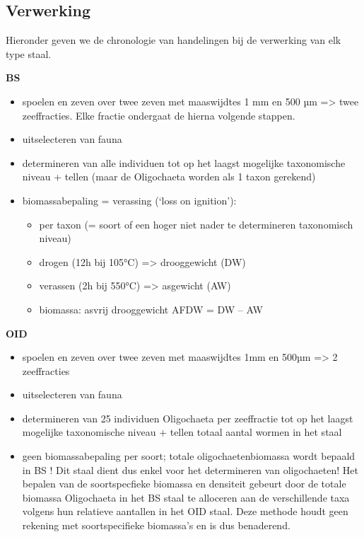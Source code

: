 \documentclass[twoside]{extreport}
\begin{document}
\hypertarget{verwerking}{%
\subsection{Verwerking}\label{verwerking}}

Hieronder geven we de chronologie van handelingen bij de verwerking van
elk type staal.

\textbf{BS}

\begin{itemize}
\tightlist
\item
  spoelen en zeven over twee zeven met maaswijdtes 1 mm en 500 µm
  =\textgreater{} twee zeeffracties. Elke fractie ondergaat de hierna
  volgende stappen.
\item
  uitselecteren van fauna
\item
  determineren van alle individuen tot op het laagst mogelijke
  taxonomische niveau + tellen (maar de Oligochaeta worden als 1 taxon
  gerekend)
\item
  biomassabepaling = verassing (`loss on ignition'):

  \begin{itemize}
  \tightlist
  \item
    per taxon (= soort of een hoger niet nader te determineren
    taxonomisch niveau)
  \item
    drogen (12h bij 105°C) =\textgreater{} drooggewicht (DW)
  \item
    verassen (2h bij 550°C) =\textgreater{} asgewicht (AW)
  \item
    biomassa: asvrij drooggewicht AFDW = DW -- AW
  \end{itemize}
\end{itemize}

\textbf{OID}

\begin{itemize}
\tightlist
\item
  spoelen en zeven over twee zeven met maaswijdtes 1mm en 500µm
  =\textgreater{} 2 zeeffracties
\item
  uitselecteren van fauna
\item
  determineren van 25 individuen Oligochaeta per zeeffractie tot op het
  laagst mogelijke taxonomische niveau + tellen totaal aantal wormen in
  het staal
\item
  geen biomassabepaling per soort; totale oligochaetenbiomassa wordt
  bepaald in BS ! Dit staal dient dus enkel voor het determineren van
  oligochaeten! Het bepalen van de soortspecfieke biomassa en densiteit
  gebeurt door de totale biomassa Oligochaeta in het BS staal te
  alloceren aan de verschillende taxa volgens hun relatieve aantallen in
  het OID staal. Deze methode houdt geen rekening met soortspecifieke
  biomassa's en is dus benaderend.
\end{itemize}
\end{document}
